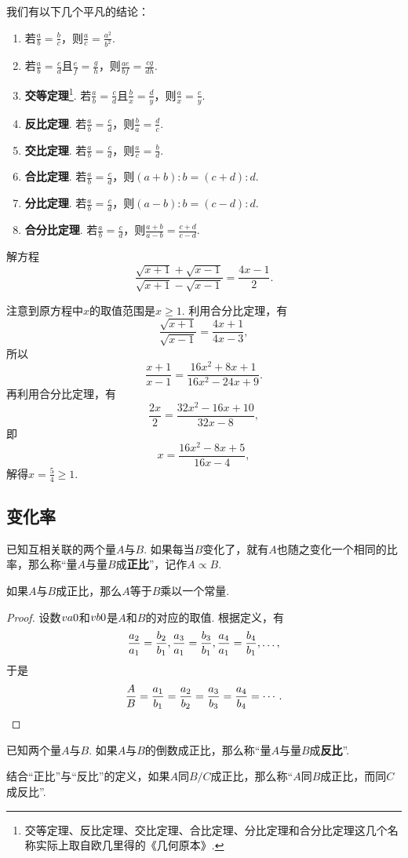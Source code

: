 我们有以下几个平凡的结论：\begin{enumerate}
\item 若\(\frac{a}{b} = \frac{b}{c}\)，则\(\frac{a}{c} = \frac{a^2}{b^2}\).
\item 若\(\frac{a}{b} = \frac{c}{d}\)且\(\frac{e}{f} = \frac{g}{h}\)，则\(\frac{ae}{bf} = \frac{cg}{dh}\).
\item \textbf{交等定理}\footnote{%
交等定理、反比定理、交比定理、合比定理、分比定理和合分比定理这几个名称实际上取自欧几里得的《几何原本》.%
}.
若\(\frac{a}{b} = \frac{c}{d}\)且\(\frac{b}{x} = \frac{d}{y}\)，则\(\frac{a}{x} = \frac{c}{y}\).
\item \textbf{反比定理}.
若\(\frac{a}{b} = \frac{c}{d}\)，则\(\frac{b}{a} = \frac{d}{c}\).
\item \textbf{交比定理}.
若\(\frac{a}{b} = \frac{c}{d}\)，则\(\frac{a}{c} = \frac{b}{d}\).
\item \textbf{合比定理}.
若\(\frac{a}{b} = \frac{c}{d}\)，则\((a+b):b = (c+d):d\).
\item \textbf{分比定理}.
若\(\frac{a}{b} = \frac{c}{d}\)，则\((a-b):b = (c-d):d\).
\item \textbf{合分比定理}.
若\(\frac{a}{b} = \frac{c}{d}\)，则\(\frac{a+b}{a-b} = \frac{c+d}{c-d}\).
\end{enumerate}

\begin{example}
解方程\[
\frac{\sqrt{x+1}+\sqrt{x-1}}{\sqrt{x+1}-\sqrt{x-1}} = \frac{4x-1}{2}.
\]
\begin{solution}
注意到原方程中\(x\)的取值范围是\(x\geqslant1\).
利用合分比定理，有\[
\frac{\sqrt{x+1}}{\sqrt{x-1}} = \frac{4x+1}{4x-3},
\]所以\[
\frac{x+1}{x-1} = \frac{16x^2+8x+1}{16x^2-24x+9}.
\]再利用合分比定理，有\[
\frac{2x}{2} = \frac{32x^2-16x+10}{32x-8},
\]即\[
x = \frac{16x^2-8x+5}{16x-4},
\]解得\(x=\frac{5}{4} \geqslant1\).
\end{solution}
\end{example}

\subsection{变化率}
\begin{definition}
已知互相关联的两个量\(A\)与\(B\).
如果每当\(B\)变化了，就有\(A\)也随之变化一个相同的比率，那么称“量\(A\)与量\(B\)成\textbf{正比}”，记作\(A \propto B\).
\end{definition}

\begin{theorem}
如果\(A\)与\(B\)成正比，那么\(A\)等于\(B\)乘以一个常量.
\begin{proof}
设数\(v{a}{0}\)和\(v{b}{0}\)是\(A\)和\(B\)的对应的取值.
根据定义，有\[
\def\f#1{%
\frac{a_#1}{a_1} = \frac{b_#1}{b_1}%
}
\f2,\f3,\f4,\dotsc,
\]于是\[
\def\f#1{\frac{a_#1}{b_#1}}
\frac{A}{B} = \f1 = \f2 = \f3 = \f4 = \dotsb.
\qedhere
\]
\end{proof}
\end{theorem}

\begin{definition}
已知两个量\(A\)与\(B\).
如果\(A\)与\(B\)的倒数成正比，那么称“量\(A\)与量\(B\)成\textbf{反比}”.
\end{definition}

结合“正比”与“反比”的定义，如果\(A\)同\(B/C\)成正比，那么称“\(A\)同\(B\)成正比，而同\(C\)成反比”.
